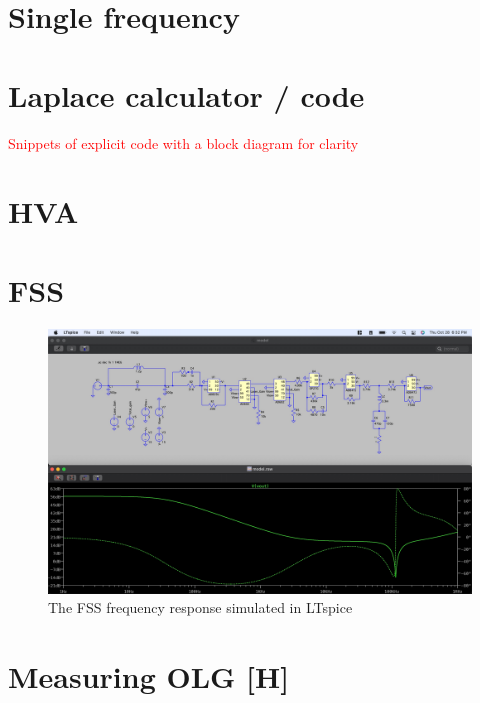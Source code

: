 \section{Single frequency}

\section{Laplace calculator / code}

\textcolor{red}{Snippets of explicit code with a block diagram for clarity}


\section{HVA}



\section{FSS}

\begin{figure}[H]
  \begin{center}
    \includegraphics[width=\textwidth]{figs/ALGAAS/tfs/spice_FSS_tf.pdf}
    \caption{The FSS frequency response simulated in LTspice}
  \end{center}
  \label{fig:spiceFSS}
\end{figure}

\section{Measuring OLG [H]}


